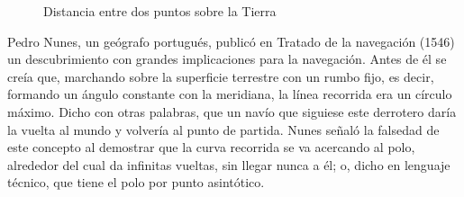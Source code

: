 \documentclass[a4paper,12pt,twoside]{article}
\begin{document}
\begin{figure}[!h]
	\caption{Distancia entre dos puntos sobre la Tierra}
\end{figure}

Pedro Nunes, un geógrafo portugués, publicó en Tratado de la navegación (1546) un descubrimiento con grandes implicaciones para la navegación. Antes de él se creía que, marchando sobre la superficie terrestre con un rumbo fijo, es decir, formando un ángulo constante con la meridiana, la línea recorrida era un círculo máximo. Dicho con otras palabras, que un navío que siguiese este derrotero daría la vuelta al mundo y volvería al punto de partida. Nunes señaló la falsedad de este concepto al demostrar que la curva recorrida se va acercando al polo, alrededor del cual da infinitas vueltas, sin llegar nunca a él; o, dicho en lenguaje técnico, que tiene el polo por punto asintótico.
\end{document}

